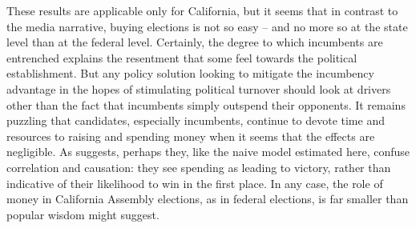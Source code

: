 \documentclass{article}
\begin{document}
These results are applicable only for California, but it seems that in contrast to the media narrative, buying elections is not so easy -- and no more so at the state level than at the federal level. Certainly, the degree to which incumbents are entrenched explains the resentment that some feel towards the political establishment. But any policy solution looking to mitigate the incumbency advantage in the hopes of stimulating political turnover should look at drivers other than the fact that incumbents simply outspend their opponents. It remains puzzling that candidates, especially incumbents, continue to devote time and resources to raising and spending money when it seems that the effects are negligible. As \cite{levitt-1994} suggests, perhaps they, like the naive model estimated here, confuse correlation and causation: they see spending as leading to victory, rather than indicative of their likelihood to win in the first place. In any case, the role of money in California Assembly elections, as in federal elections, is far smaller than popular wisdom might suggest.

\pagebreak



\pagebreak
\end{document}
